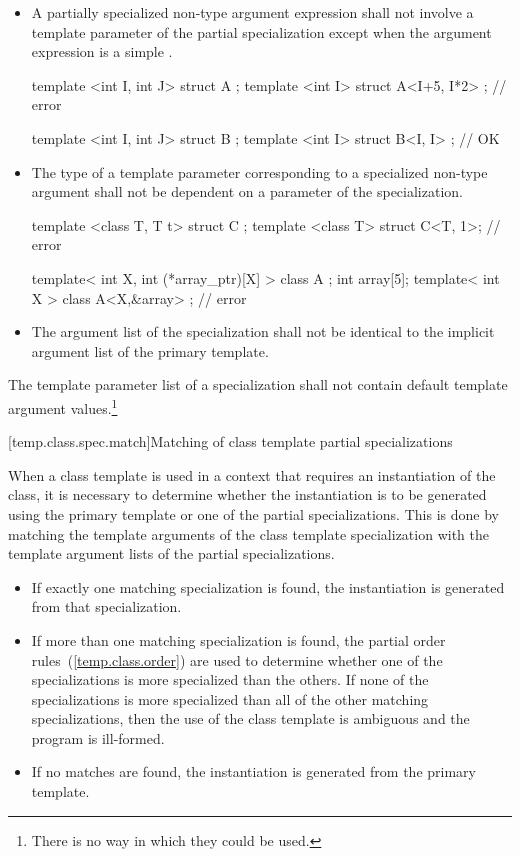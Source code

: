 \begin{itemize}
\item
A partially specialized non-type argument expression shall not involve
a template parameter of the partial specialization except when the argument
expression is a simple
.
\enterexample
\begin{codeblock}
template <int I, int J> struct A {};
template <int I> struct A<I+5, I*2> {}; // error

template <int I, int J> struct B {};
template <int I> struct B<I, I> {};     // OK
\end{codeblock}
\exitexampleb
\item
The type of a template parameter corresponding to a specialized non-type argument
shall not be dependent on a parameter of the specialization.
\enterexample

\begin{codeblock}
template <class T, T t> struct C {};
template <class T> struct C<T, 1>;		// error

template< int X, int (*array_ptr)[X] > class A {};
int array[5];
template< int X > class A<X,&array> { };	// error
\end{codeblock}

\exitexampleb
\item
The argument list of the specialization shall not be identical to the
implicit argument list of the primary template.
\end{itemize}

\pnum
The template parameter list of a specialization shall not contain default
template argument values.\footnote{There is no way in which they could be used.}

[temp.class.spec.match]{Matching of class template partial specializations}

\pnum
When a class template is used in a context that requires an instantiation of
the class,
it is necessary to determine whether the instantiation is to be generated
using the primary template or one of the partial specializations.
This is done by matching the template arguments of the class template
specialization with the template argument lists of the partial
specializations.

\begin{itemize}
\item
If exactly one matching specialization is found, the instantiation is
generated from that specialization.
\item
If more than one matching specialization is found,
the partial order rules~(\ref{temp.class.order}) are used to determine
whether one of the specializations is more specialized than the
others.
If none of the specializations is more specialized than all of the
other matching specializations, then the use of the class template
is ambiguous and the program is ill-formed.
\item
If no matches are found, the instantiation is generated from the
primary template.
\end{itemize}

